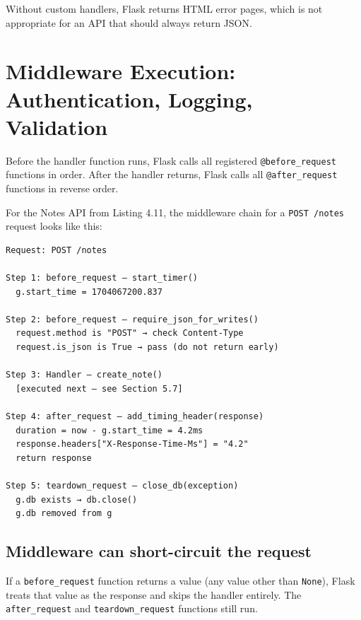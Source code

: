 \noindent{}Without custom handlers, Flask returns HTML error pages, which is not appropriate for an API that should always return JSON.

\setcounter{section}{5}
\section{Middleware Execution: Authentication, Logging, Validation}\label{05-internal-request-execution:56-middleware-execution-authentication-logging-validation}

Before the handler function runs, Flask calls all registered \texttt{@before\_request} functions in order. After the handler returns, Flask calls all \texttt{@after\_request} functions in reverse order.

For the Notes API from Listing 4.11, the middleware chain for a \texttt{POST\ /notes} request looks like this:

\begin{outputbox}
\begin{Verbatim}[fontsize=\codesize, breaklines, breakanywhere, breaksymbolleft={\tiny\textcolor{muted}{$\hookrightarrow$}}]
Request: POST /notes

Step 1: before_request — start_timer()
  g.start_time = 1704067200.837

Step 2: before_request — require_json_for_writes()
  request.method is "POST" → check Content-Type
  request.is_json is True → pass (do not return early)

Step 3: Handler — create_note()
  [executed next — see Section 5.7]

Step 4: after_request — add_timing_header(response)
  duration = now - g.start_time = 4.2ms
  response.headers["X-Response-Time-Ms"] = "4.2"
  return response

Step 5: teardown_request — close_db(exception)
  g.db exists → db.close()
  g.db removed from g
\end{Verbatim}
\end{outputbox}

\subsection*{Middleware can short-circuit the request}\label{05-internal-request-execution:middleware-can-short-circuit-the-request}

If a \texttt{before\_request} function returns a value (any value other than \texttt{None}), Flask treats that value as the response and skips the handler entirely. The \texttt{after\_request} and \texttt{teardown\_request} functions still run.


